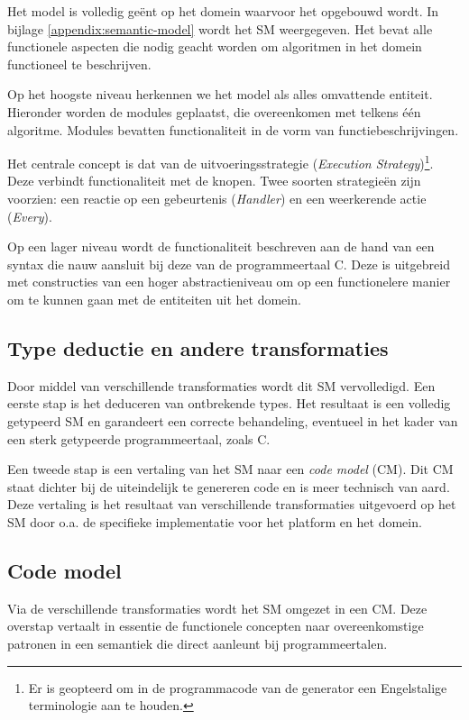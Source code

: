 Het model is volledig ge\"ent op het domein waarvoor het opgebouwd wordt. In
bijlage \ref{appendix:semantic-model} wordt het SM weergegeven. Het bevat alle
functionele aspecten die nodig geacht worden om algoritmen in het domein
functioneel te beschrijven.

Op het hoogste niveau herkennen we het model als alles omvattende entiteit.
Hieronder worden de modules geplaatst, die overeenkomen met telkens \'e\'en
algoritme. Modules bevatten functionaliteit in de vorm van
functiebeschrijvingen.

Het centrale concept is dat van de uitvoeringsstrategie (\emph{Execution
Strategy})\footnote{Er is geopteerd om in de programmacode van de generator een
Engelstalige terminologie aan te houden.}. Deze verbindt functionaliteit met de
knopen. Twee soorten strategie\"en zijn voorzien: een reactie op een
gebeurtenis (\emph{Handler}) en een weerkerende actie (\emph{Every}).

Op een lager niveau wordt de functionaliteit beschreven aan de hand van een
syntax die nauw aansluit bij deze van de programmeertaal C. Deze is uitgebreid
met constructies van een hoger abstractieniveau om op een functionelere manier
om te kunnen gaan met de entiteiten uit het domein.

\subsection{Type deductie en andere transformaties}

Door middel van verschillende transformaties wordt dit SM vervolledigd. Een
eerste stap is het deduceren van ontbrekende types. Het resultaat is een
volledig getypeerd SM en garandeert een correcte behandeling, eventueel in het
kader van een sterk getypeerde programmeertaal, zoals C.

Een tweede stap is een vertaling van het SM naar een \emph{code model} (CM).
Dit CM staat dichter bij de uiteindelijk te genereren code en is meer technisch
van aard. Deze vertaling is het resultaat van verschillende transformaties
uitgevoerd op het SM door o.a. de specifieke implementatie voor het platform en
het domein.

\subsection{Code model}
\label{subsection:arch-code-model}

Via de verschillende transformaties wordt het SM omgezet in een CM. Deze
overstap vertaalt in essentie de functionele concepten naar overeenkomstige
patronen in een semantiek die direct aanleunt bij programmeertalen.

